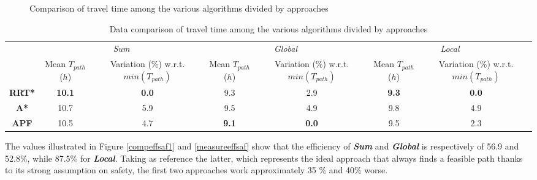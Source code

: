 \begin{figure}[h]
	\centering
	\hspace{0.2cm}
	\hspace{0.2cm}
	\captionsetup{font=footnotesize,labelfont=footnotesize}
	\caption{Comparison of travel time among the various algorithms divided by approaches} 
	\label{compapproach}
\end{figure}

\begin{table}[htbp]
	\small
	\centering
	
	\begin{tabular}{|c|c|c|c|c|c|c|}
		\hline
		\multirow{3}{*}{}  & \multicolumn{2}{c|}{\textit{Sum}} & \multicolumn{2}{c|}{\textit{Global}} & \multicolumn{2}{c|}{\textit{Local}} \bigstrut\\
		\cline{2-7}
		& \multirow{2}{*}{\parbox{3em}{\centering \small Mean $T_{path}$($h$)}} & \multirow{2}{*}{\parbox{4em}{\centering \scriptsize Variation (\%) w.r.t. $min(T_{path})$}} & \multirow{2}{*}{\parbox{3em}{\centering \small Mean $T_{path}$($h$)}} & \multirow{2}{*}{\parbox{4em}{\centering \scriptsize Variation (\%) w.r.t. $min(T_{path})$}} & \multirow{2}{*}{\parbox{3em}{\centering \small Mean $T_{path}$($h$)}} & \multirow{2}{*}{\parbox{4em}{\centering \scriptsize Variation (\%) w.r.t. $min(T_{path})$}} \bigstrut[t]\\
		&   &   &   &   & & \bigstrut[b]\\
		\hline
		\small \textbf{RRT*}   & \textbf{10.1}  & \textbf{0.0}   & 9.3   & 2.9   & \textbf{9.3}   & \textbf{0.0} \bigstrut\\
		\hline
		\small \textbf{A*}    & 10.7  & 5.9   & 9.5   & 4.9   & 9.8   & 4.9 \bigstrut\\
		\hline
		\small \textbf{APF}   & 10.5  & 4.7   & \textbf{9.1}   & \textbf{0.0}   & 9.5   & 2.3 \bigstrut\\
		\hline
	\end{tabular}%
	\captionsetup{font=footnotesize,labelfont=footnotesize}
	\caption{Data comparison of travel time among the various algorithms divided by approaches}
	\label{tablecompapproach}%
\end{table}%
\newpage
The values illustrated in Figure \ref{compeffsaf1} and \ref{measureeffsaf} show that the efficiency of \textbf{\textit{Sum}} and \textbf{\textit{Global}} is respectively of 56.9 and 52.8\%, while 87.5\% for \textbf{\textit{Local}}. Taking as reference the latter, which represents the ideal approach that always finds a feasible path thanks to its strong assumption on safety, the first two approaches work approximately 35 \% and 40\% worse. 
